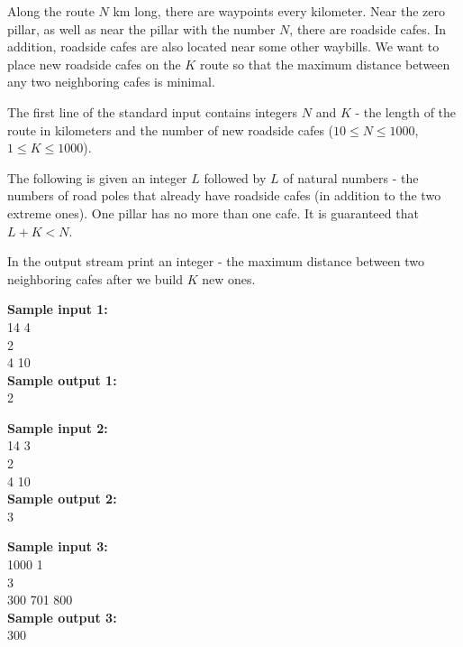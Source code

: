 \documentclass[a4paper]{article}
\begin{document}
Along the route $N$ km long, there are waypoints every kilometer. Near the zero pillar, as well as near the pillar with the number $N$, there are roadside cafes. In addition, roadside cafes are also located near some other waybills. We want to place new roadside cafes on the $K$ route so that the maximum distance between any two neighboring cafes is minimal.

The first line of the standard input contains integers $N$ and $K$ - the length of the route in kilometers and the number of new roadside cafes ($10 \le N \le 1000$, $1 \le K  \le 1000$).

The following is given an integer $L$ followed by $L$ of natural numbers - the numbers of road poles that already have roadside cafes (in addition to the two extreme ones). One pillar has no more than one cafe. It is guaranteed that $L + K < N$.

In the output stream print an integer - the maximum distance between two neighboring cafes after we build $K$ new ones.

\LINE

\noindent \textbf{Sample input 1:}\\
14 4\\
2\\
4 10\\

\noindent \textbf{Sample output 1:}\\
2

\SPACE

\noindent \textbf{Sample input 2:}\\
14 3\\
2\\
4 10\\

\noindent \textbf{Sample output 2:}\\
3

\SPACE

\noindent \textbf{Sample input 3:}\\
1000 1\\
3\\
300 701 800\\

\noindent \textbf{Sample output 3:}\\
300
\end{document}
